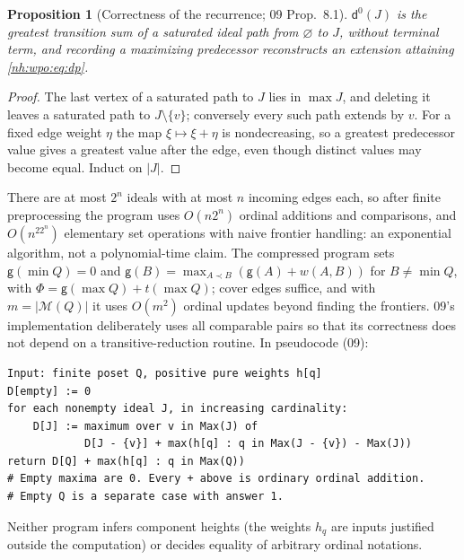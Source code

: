 \documentclass[11pt,a4paper]{article}
\newtheorem{proposition}[theorem]{Proposition}
\theoremstyle{definition}
\theoremstyle{remark}
\newcommand{\M}{\mathcal M}
\begin{document}
\begin{proposition}[Correctness of the recurrence; 09 Prop.~8.1]\label{nh:wpo:prop:dp}
$\mathsf d^0(J)$ is the greatest transition sum of a saturated ideal path from
$\varnothing$ to $J$, without terminal term, and recording a maximizing
predecessor reconstructs an extension attaining \eqref{nh:wpo:eq:dp}.
\end{proposition}
\begin{proof}
The last vertex of a saturated path to $J$ lies in $\max J$, and deleting it
leaves a saturated path to $J\setminus\{v\}$; conversely every such path extends
by $v$. For a fixed edge weight $\eta$ the map $\xi\mapsto\xi+\eta$ is
nondecreasing, so a greatest predecessor value gives a greatest value after the
edge, even though distinct values may become equal. Induct on $|J|$.
\end{proof}

There are at most $2^n$ ideals with at most $n$ incoming edges each, so after
finite preprocessing the program uses $O(n2^n)$ ordinal additions and comparisons,
and $O(n^22^n)$ elementary set operations with naive frontier handling: an
exponential algorithm, not a polynomial-time claim. The compressed program sets
$\mathsf g(\min Q)=0$ and $\mathsf g(B)=\max_{A\prec B}(\mathsf g(A)+w(A,B))$ for
$B\ne\min Q$, with $\Phi=\mathsf g(\max Q)+t(\max Q)$; cover edges suffice, and
with $m=|\M(Q)|$ it uses $O(m^2)$ ordinal updates beyond finding the frontiers.
09's implementation deliberately uses all comparable pairs so that its
correctness does not depend on a transitive-reduction routine. In
pseudocode (09):
\begin{lstlisting}
Input: finite poset Q, positive pure weights h[q]
D[empty] := 0
for each nonempty ideal J, in increasing cardinality:
    D[J] := maximum over v in Max(J) of
            D[J - {v}] + max(h[q] : q in Max(J - {v}) - Max(J))
return D[Q] + max(h[q] : q in Max(Q))
# Empty maxima are 0. Every + above is ordinary ordinal addition.
# Empty Q is a separate case with answer 1.
\end{lstlisting} Neither program
infers component heights (the weights $h_q$ are inputs justified outside the
computation) or decides equality of arbitrary ordinal notations.
\end{document}
